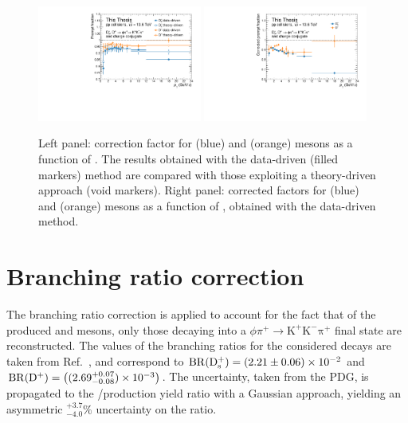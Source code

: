 \begin{figure}
    \begin{center}
    \includegraphics[width=0.48\textwidth]{Figures/Chapter 6/Compare_data_theory_frac.pdf}
    \includegraphics[width=0.48\textwidth]{Figures/Chapter 6/Compare_prompt_frac.pdf}
    \caption{Left panel: \fp correction factor for \ds (blue) and \dpl (orange) mesons as a function of \pt. The results obtained with the data-driven (filled markers) method are compared with those exploiting a theory-driven approach (void markers). Right panel: corrected \fp factors for \ds (blue) and \dpl (orange) mesons as a function of \pt, obtained with the data-driven method.} 
    \label{fig:fp_comparison} 
    \end{center}
\end{figure}

\section{Branching ratio correction}
\begin{sloppypar}

The branching ratio correction is applied to account for the fact that of the produced \ds and \dpl mesons, only those decaying into a $\phi\pi^+\rightarrow\mathrm{K^+K^-\pi^+}$ final state are reconstructed. The values of the branching ratios for the considered decays are taken from Ref.~\cite{pdg}, and correspond to \mbox{$\mathrm{BR}(\mathrm{D_s^+}) = (2.21\pm0.06)\times10^{-2}$} and \mbox{$\mathrm{BR}(\mathrm{D^+}) = \left((2.69^{+0.07}_{-0.08})\times10^{-3}\right)$}. The uncertainty, taken from the PDG, is propagated to the \ds/\dpl production yield ratio with a Gaussian approach, yielding an asymmetric $^{+3.7}_{-4.0}\%$ uncertainty on the ratio.
\end{sloppypar}

